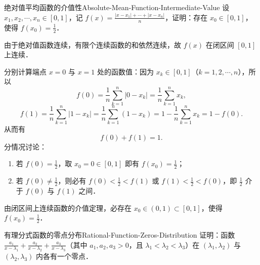 \begin{problem}{绝对值平均函数的介值性}{Absolute-Mean-Function-Intermediate-Value}
    设 $x_1, x_2, \cdots, x_n \in [0, 1]$，记 $f(x) = \frac{|x-x_1| + \cdots + |x-x_n|}{n}$，证明：存在 $x_0 \in [0, 1]$，使得 $f(x_0) = \frac{1}{2}$．
\end{problem}

\begin{myproof}
    由于绝对值函数连续，有限个连续函数的和依然连续，故 $f(x)$ 在闭区间 $[0, 1]$ 上连续．

    分别计算端点 $x = 0$ 与 $x = 1$ 处的函数值：因为 $x_k \in [0, 1]$（$k = 1, 2, \cdots, n$），所以
    \begin{equation}
        f(0) = \frac{1}{n} \sum_{k=1}^n |0 - x_k| = \frac{1}{n} \sum_{k=1}^n x_k,
    \end{equation}
    \begin{equation}
        f(1) = \frac{1}{n} \sum_{k=1}^n |1 - x_k| = \frac{1}{n} \sum_{k=1}^n (1 - x_k) = 1 - \frac{1}{n} \sum_{k=1}^n x_k = 1 - f(0).
    \end{equation}
    从而有
    \begin{equation}
        f(0) + f(1) = 1.
    \end{equation}
    分情况讨论：
    \begin{enumerate}
        \item 若 $f(0) = \frac{1}{2}$，取 $x_0 = 0 \in [0, 1]$ 即有 $f(x_0) = \frac{1}{2}$；
        \item 若 $f(0) \neq \frac{1}{2}$，则必有 $f(0) < \frac{1}{2} < f(1)$ 或 $f(1) < \frac{1}{2} < f(0)$，即 $\frac{1}{2}$ 介于 $f(0)$ 与 $f(1)$ 之间．
    \end{enumerate}
    由闭区间上连续函数的介值定理，必存在 $x_0 \in (0, 1) \subset [0, 1]$，使得 $f(x_0) = \frac{1}{2}$．
\end{myproof}

\begin{problem}{有理分式函数的零点分布}{Rational-Function-Zeros-Distribution}
    证明：函数 $\frac{a_1}{x-\lambda_1} + \frac{a_2}{x-\lambda_2} + \frac{a_3}{x-\lambda_3}$（其中 $a_1, a_2, a_3 > 0$，且 $\lambda_1 < \lambda_2 < \lambda_3$）在 $(\lambda_1, \lambda_2)$ 与 $(\lambda_2, \lambda_3)$ 内各有一个零点．
\end{problem}

